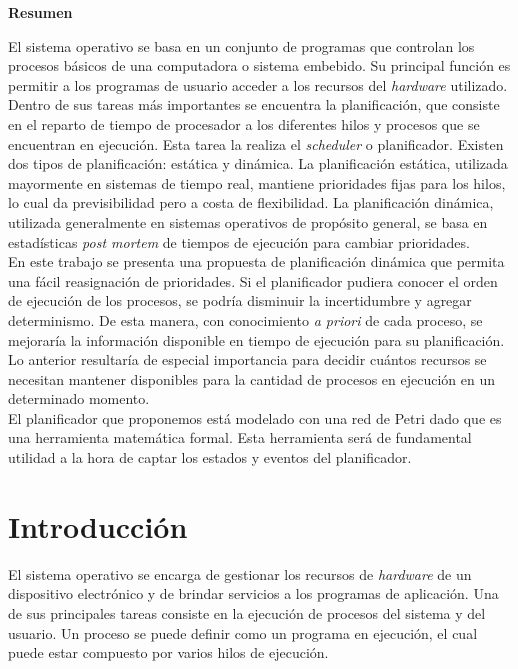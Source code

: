 \documentclass[a4paper]{book}
\begin{document}
\begin{large}
\textbf{Resumen}
\vspace{0.5cm}
\end{large}

El sistema operativo se basa en un conjunto de programas que controlan los procesos básicos de una computadora o sistema embebido. Su principal funci\'on es permitir a los programas de usuario acceder a los recursos del \emph{hardware} utilizado. Dentro de sus tareas m\'as importantes se encuentra la planificaci\'on, que consiste en el reparto de tiempo de procesador a los diferentes hilos y procesos que se encuentran en ejecuci\'on. Esta tarea la realiza el \emph{scheduler} o planificador. Existen dos tipos de planificación: estática y dinámica. La planificación estática, utilizada mayormente en sistemas de tiempo real, mantiene prioridades fijas para los hilos, lo cual da previsibilidad pero a costa de flexibilidad. La planificación dinámica, utilizada generalmente en sistemas operativos de propósito general, se basa en estadísticas \emph{post mortem} de tiempos de ejecución para cambiar prioridades.\\

En este trabajo se presenta una propuesta de planificaci\'on din\'amica que permita una f\'acil reasignaci\'on de prioridades. Si el planificador pudiera conocer el orden de ejecución de los procesos, se podría disminuir la incertidumbre y agregar determinismo. De esta manera, con conocimiento \textit{a priori} de cada proceso, se mejoraría la información disponible en tiempo de ejecución para su planificación. Lo anterior resultar\'ia de especial importancia para decidir cu\'antos recursos se necesitan mantener disponibles para la cantidad de procesos en ejecuci\'on en un determinado momento.\\

El planificador que proponemos está modelado con una red de Petri dado que es una herramienta matem\'atica formal. Esta herramienta ser\'a de fundamental utilidad a la hora de captar los estados y eventos del planificador.

\clearpage\null\newpage

\tableofcontents

\mainmatter
\newpage

\section{Introducci\'on}

El sistema operativo se encarga de gestionar los recursos de \emph{hardware} de un dispositivo electrónico y de brindar servicios a los programas de aplicación. Una de sus principales tareas consiste en la ejecuci\'on de procesos del sistema y del usuario. Un proceso se puede definir como un programa en ejecución, el cual puede estar compuesto por varios hilos de ejecución.\\
\end{document}
